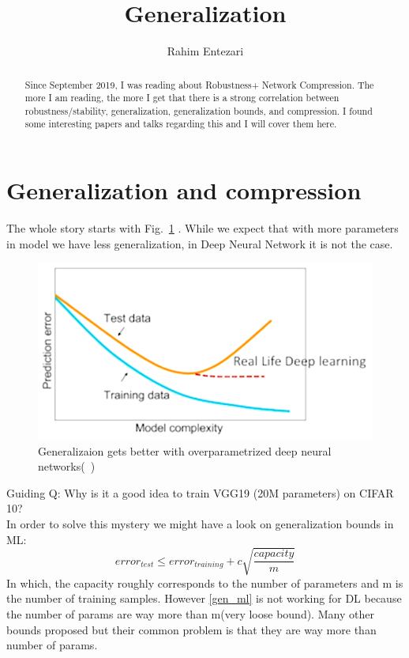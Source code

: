 \documentclass{article} %
\title{Generalization}
\author{Rahim Entezari}
\newcommand{\figref}[1]{Fig.~\ref{#1}}
\begin{document}
\maketitle

\begin{abstract}
Since September 2019, I was reading about Robustness+ Network Compression. The more I am reading, the more I get that there is a strong correlation between robustness/stability, generalization, generalization bounds, and compression. I found some interesting papers and talks regarding this and I will cover them here.
\end{abstract}

\section{Generalization and compression}
The whole story starts with \figref{generalization_mystery} . While we expect that with more parameters in model we have less generalization, in Deep Neural Network it is not the case.

\begin{figure}[h]
\begin{center}
\includegraphics[width=0.5\columnwidth]{pix/ICML2019Slides.png}
\caption{Generalizaion gets better with overparametrized deep neural networks(~\cite{arora2018stronger})}
\end{center}
\label{generalization_mystery}
\end{figure}

Guiding Q: Why is it a good idea to train VGG19 (20M parameters) on CIFAR 10?\\In order to solve this mystery we might have a look on generalization bounds in ML:
\begin{equation}
	error_{test} \leq error_{training} + c \sqrt{\frac{capacity}{m}}
\label{gen_ml}
\end{equation}
In which, the capacity roughly corresponds to the number of parameters and m is the number of training samples.
However \eqref{gen_ml} is not working for DL because the number of params are way more than m(very loose bound). Many other bounds proposed but their common problem is that they are way more than number of params.
\end{document}
